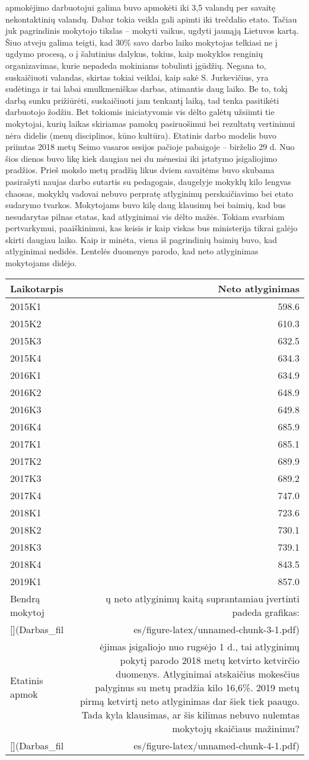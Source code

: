 \documentclass[]{article}
\begin{document}
apmokėjimo darbuotojui galima buvo apmokėti iki 3,5 valandų per savaitę
nekontaktinių valandų. Dabar tokia veikla gali apimti iki trečdalio
etato. Tačiau juk pagrindinis mokytojo tikslas -- mokyti vaikus, ugdyti
jaunąją Lietuvos kartą. Šiuo atveju galima teigti, kad 30\% savo darbo
laiko mokytojas telkiasi ne į ugdymo procesą, o į šalutinius dalykus,
tokius, kaip mokyklos renginių organizavimas, kurie nepadeda mokiniams
tobulinti įgūdžių. Negana to, suskaičiuoti valandas, skirtas tokiai
veiklai, kaip sakė S. Jurkevičius, yra sudėtinga ir tai labai
smulkmeniškas darbas, atimantis daug laiko. Be to, tokį darbą sunku
prižiūrėti, suskaičiuoti jam tenkantį laiką, tad tenka pasitikėti
darbuotojo žodžiu. Bet tokiomis iniciatyvomis vis dėlto galėtų užsiimti
tie mokytojai, kurių laikas skiriamas pamokų pasiruošimui bei rezultatų
vertinimui nėra didelis (menų disciplinos, kūno kultūra). Etatinis darbo
modelis buvo priimtas 2018 metų Seimo vasaros sesijos pačioje pabaigoje
-- birželio 29 d. Nuo šios dienos buvo likę kiek daugiau nei du mėnesiai
iki įstatymo įsigaliojimo pradžios. Prieš mokslo metų pradžią likus
dviem savaitėms buvo skubama pasirašyti naujas darbo sutartis su
pedagogais, daugelyje mokyklų kilo lengvas chaosas, mokyklų vadovai
nebuvo perpratę atlyginimų perskaičiavimo bei etato sudarymo tvarkos.
Mokytojams buvo kilę daug klausimų bei baimių, kad bus nesudarytas
pilnas etatas, kad atlyginimai vis dėlto mažės. Tokiam svarbiam
pertvarkymui, paaiškinimui, kas keisis ir kaip viskas bus ministerija
tikrai galėjo skirti daugiau laiko. Kaip ir minėta, viena iš pagrindinių
baimių buvo, kad atlyginimai nedidės. Lentelės duomenys parodo, kad neto
atlyginimas mokytojams didėjo.

\begin{longtable}[]{@{}lr@{}}
\toprule
Laikotarpis & Neto atlyginimas\tabularnewline
\midrule
\endhead
2015K1 & 598.6\tabularnewline
2015K2 & 610.3\tabularnewline
2015K3 & 632.5\tabularnewline
2015K4 & 634.3\tabularnewline
2016K1 & 634.9\tabularnewline
2016K2 & 648.9\tabularnewline
2016K3 & 649.8\tabularnewline
2016K4 & 685.9\tabularnewline
2017K1 & 685.1\tabularnewline
2017K2 & 689.9\tabularnewline
2017K3 & 689.2\tabularnewline
2017K4 & 747.0\tabularnewline
2018K1 & 723.6\tabularnewline
2018K2 & 730.1\tabularnewline
2018K3 & 739.1\tabularnewline
2018K4 & 843.5\tabularnewline
2019K1 & 857.0\tabularnewline
Bendrą mokytoj & ų neto atlyginimų kaitą suprantamiau įvertinti padeda
grafikas:\tabularnewline
{[}{]}(Darbas\_fil &
es/figure-latex/unnamed-chunk-3-1.pdf)\tabularnewline
Etatinis apmok & ėjimas įsigaliojo nuo rugsėjo 1 d., tai atlyginimų
pokytį parodo 2018 metų ketvirto ketvirčio duomenys. Atlyginimai
atskaičius mokesčius palyginus su metų pradžia kilo 16,6\%. 2019 metų
pirmą ketvirtį neto atlyginimas dar šiek tiek paaugo. Tada kyla
klausimas, ar šis kilimas nebuvo nulemtas mokytojų skaičiaus
mažinimu?\tabularnewline
{[}{]}(Darbas\_fil &
es/figure-latex/unnamed-chunk-4-1.pdf)\tabularnewline
\bottomrule
\end{longtable}
\end{document}
